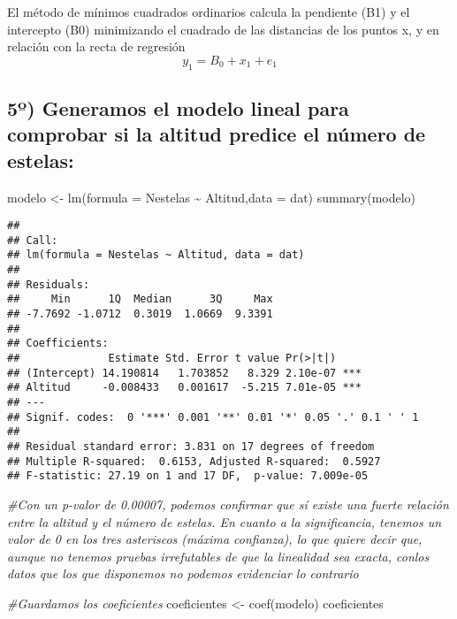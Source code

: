 \documentclass[
]{article}
\newenvironment{Shaded}{\begin{snugshade}}{\end{snugshade}}
\newcommand{\AttributeTok}[1]{\textcolor[rgb]{0.77,0.63,0.00}{#1}}
\newcommand{\CommentTok}[1]{\textcolor[rgb]{0.56,0.35,0.01}{\textit{#1}}}
\newcommand{\FunctionTok}[1]{\textcolor[rgb]{0.00,0.00,0.00}{#1}}
\newcommand{\NormalTok}[1]{#1}
\newcommand{\OtherTok}[1]{\textcolor[rgb]{0.56,0.35,0.01}{#1}}
\newcommand{\SpecialCharTok}[1]{\textcolor[rgb]{0.00,0.00,0.00}{#1}}
\begin{document}
El método de mínimos cuadrados ordinarios calcula la pendiente (B1) y el
intercepto (B0) minimizando el cuadrado de las distancias de los puntos
x, y en relación con la recta de regresión \[y_1 = B_0 + x_1 + e_1\]

\hypertarget{uxba-generamos-el-modelo-lineal-para-comprobar-si-la-altitud-predice-el-nuxfamero-de-estelas}{%
\subsection{5º) Generamos el modelo lineal para comprobar si la altitud
predice el número de
estelas:}\label{uxba-generamos-el-modelo-lineal-para-comprobar-si-la-altitud-predice-el-nuxfamero-de-estelas}}

\begin{Shaded}
\begin{Highlighting}[]
\NormalTok{modelo }\OtherTok{\textless{}{-}} \FunctionTok{lm}\NormalTok{(}\AttributeTok{formula =}\NormalTok{ Nestelas }\SpecialCharTok{\textasciitilde{}}\NormalTok{ Altitud,}\AttributeTok{data =}\NormalTok{ dat)}
\FunctionTok{summary}\NormalTok{(modelo)}
\end{Highlighting}
\end{Shaded}

\begin{verbatim}
## 
## Call:
## lm(formula = Nestelas ~ Altitud, data = dat)
## 
## Residuals:
##     Min      1Q  Median      3Q     Max 
## -7.7692 -1.0712  0.3019  1.0669  9.3391 
## 
## Coefficients:
##              Estimate Std. Error t value Pr(>|t|)    
## (Intercept) 14.190814   1.703852   8.329 2.10e-07 ***
## Altitud     -0.008433   0.001617  -5.215 7.01e-05 ***
## ---
## Signif. codes:  0 '***' 0.001 '**' 0.01 '*' 0.05 '.' 0.1 ' ' 1
## 
## Residual standard error: 3.831 on 17 degrees of freedom
## Multiple R-squared:  0.6153, Adjusted R-squared:  0.5927 
## F-statistic: 27.19 on 1 and 17 DF,  p-value: 7.009e-05
\end{verbatim}

\begin{Shaded}
\begin{Highlighting}[]
\CommentTok{\#Con un p{-}valor de 0.00007, podemos confirmar que sí existe una fuerte relación entre la altitud y el número de estelas. En cuanto a la significancia, tenemos un valor de 0 en los tres asteriscos (máxima confianza), lo que quiere decir que, aunque no tenemos pruebas irrefutables de que la linealidad sea exacta, conlos datos que los que disponemos no podemos evidenciar lo contrario}

\CommentTok{\#Guardamos los coeficientes}
\NormalTok{coeficientes }\OtherTok{\textless{}{-}} \FunctionTok{coef}\NormalTok{(modelo)}
\NormalTok{coeficientes}
\end{Highlighting}
\end{Shaded}
\end{document}

